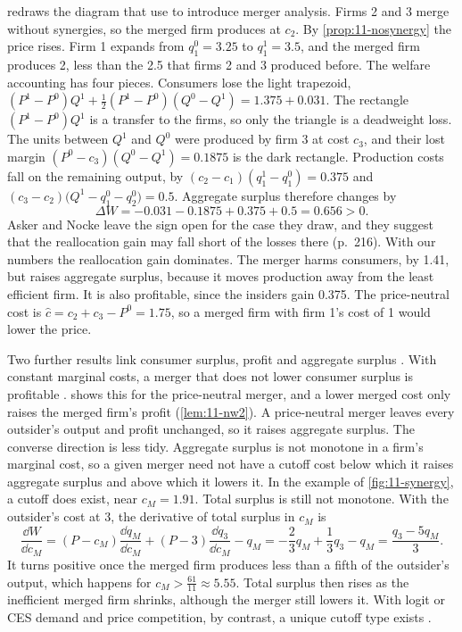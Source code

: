  redraws the diagram that \citet[pp.~216--217]{AskerNocke2021} use to introduce merger analysis.
Firms 2 and 3 merge without synergies, so the merged firm produces at $c_2$. By \cref{prop:11-nosynergy} the price
rises. Firm 1 expands from $q_1^0 = 3.25$ to $q_1^1 = 3.5$, and the merged firm produces 2, less than the 2.5 that
firms 2 and 3 produced before. The welfare accounting has four pieces. Consumers lose the light trapezoid,
$(P^1 - P^0)Q^1 + \frac{1}{2}(P^1 - P^0)(Q^0 - Q^1) = 1.375 + 0.031$. The rectangle $(P^1 - P^0)Q^1$ is a transfer to
the firms, so only the triangle is a deadweight loss. The units between $Q^1$ and $Q^0$ were produced by firm 3 at
cost $c_3$, and their lost margin $(P^0 - c_3)(Q^0 - Q^1) = 0.1875$ is the dark rectangle. Production costs fall on
the remaining output, by $(c_2 - c_1)(q_1^1 - q_1^0) = 0.375$ and $(c_3 - c_2)\big(Q^1 - q_1^0 - q_2^0\big) = 0.5$.
Aggregate surplus therefore changes by
\begin{equation*}
\Delta W = -0.031 - 0.1875 + 0.375 + 0.5 = 0.656 > 0 .
\end{equation*}
Asker and Nocke leave the sign open for the case they draw, and they suggest that the reallocation gain may fall short
of the losses there (p.~216). With our numbers the reallocation gain dominates. The merger harms consumers, by 1.41, but raises aggregate surplus, because it moves production away from the least
efficient firm. It is also profitable, since the insiders gain 0.375. The price-neutral cost is $\hat c = c_2 + c_3 -
P^0 = 1.75$, so a merged firm with firm 1's cost of 1 would lower the price.

Two further results link consumer surplus, profit and aggregate surplus \citep[p.~230]{AskerNocke2021}. With
constant marginal costs, a merger that does not lower consumer surplus is profitable \citep{NockeWhinston2010}.
 shows this for the price-neutral merger, and a lower merged cost only raises the merged
firm's profit (\cref{lem:11-nw2}). A price-neutral merger leaves every outsider's output and profit unchanged, so it
raises aggregate surplus. The converse direction is less tidy. Aggregate surplus is not monotone in a firm's marginal
cost, so a given merger need not have a cutoff cost below which it raises aggregate surplus and above which it lowers
it. In the example of \cref{fig:11-synergy}, a cutoff does exist, near $c_M = 1.91$. Total surplus is still not
monotone. With the outsider's cost at 3, the derivative of total surplus in $c_M$ is
\begin{equation*}
\frac{\dd W}{\dd c_M} = (P - c_M)\frac{\dd q_M}{\dd c_M} + (P - 3)\frac{\dd q_3}{\dd c_M} - q_M
= -\frac{2}{3}q_M + \frac{1}{3}q_3 - q_M = \frac{q_3 - 5q_M}{3} .
\end{equation*}
It turns positive once the merged firm produces less than a fifth of the outsider's output, which happens for $c_M >
\frac{61}{11} \approx 5.55$. Total surplus then rises as the inefficient merged firm shrinks, although the merger
still lowers it. With logit or CES demand and price competition, by contrast, a unique cutoff type exists
\citep[n.~129]{AskerNocke2021}.

